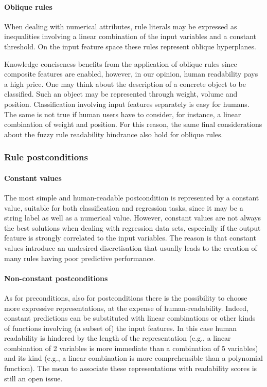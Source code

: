\documentclass[sigconf]{acmart}
\begin{document}
\paragraph{Oblique rules}

When dealing with numerical attributes, rule literals may be expressed as inequalities involving a linear combination of the input variables and a constant threshold.
%
On the input feature space these rules represent oblique hyperplanes.

Knowledge conciseness benefits from the application of oblique rules since composite features are enabled, however, in our opinion, human readability pays a high price.
%
One may think about the description of a concrete object to be classified.
%
Such an object may be represented through weight, volume and position.
%
Classification involving input features separately is easy for humans.
%
The same is not true if human users have to consider, for instance, a linear combination of weight and position.
%
For this reason, the same final considerations about the fuzzy rule readability hindrance also hold for oblique rules.

\subsubsection{Rule postconditions}

\paragraph{Constant values}

The most simple and human-readable postcondition is represented by a constant value, suitable for both classification and regression tasks, since it may be a string label as well as a numerical value.
%
However, constant values are not always the best solutions when dealing with regression data sets, especially if the output feature is strongly correlated to the input variables.
%
The reason is that constant values introduce an undesired discretisation that usually leads to the creation of many rules having poor predictive performance.

\paragraph{Non-constant postconditions}

As for preconditions, also for postconditions there is the possibility to choose more expressive representations, at the expense of human-readability.
%
Indeed, constant predictions can be substituted with linear combinations or other kinds of functions involving (a subset of) the input features.
%
In this case human readability is hindered by the length of the representation (e.g., a linear combination of 2 variables is more immediate than a combination of 5 variables) and its kind (e.g., a linear combination is more comprehensible than a polynomial function).
%
The mean to associate these representations with readability scores is still an open issue.
\end{document}
